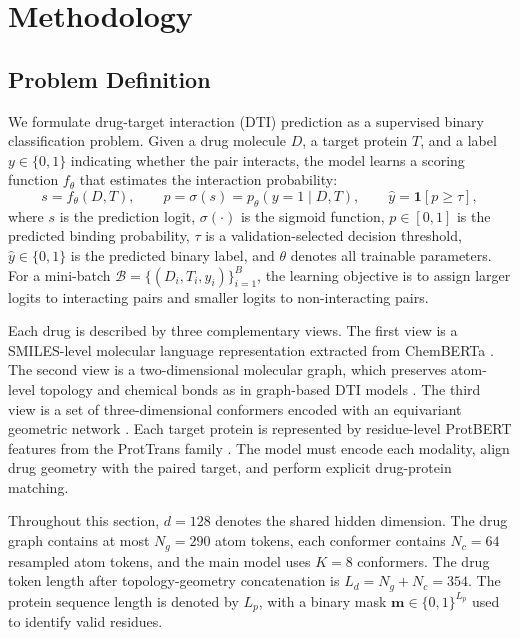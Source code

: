 \section{Methodology}
\label{sec:methodology}

\subsection{Problem Definition}
\label{sec:problem_definition}

We formulate drug-target interaction (DTI) prediction as a supervised binary
classification problem. Given a drug molecule $D$, a target protein $T$, and a
label $y\in\{0,1\}$ indicating whether the pair interacts, the model learns a
scoring function $f_{\theta}$ that estimates the interaction probability:
\begin{equation}
  s = f_{\theta}(D,T), \qquad
  p = \sigma(s)
  = p_{\theta}(y=1\mid D,T),
  \qquad
  \hat{y} = \mathbf{1}[p\!\ge\!\tau],
  \label{eq:dti_prediction}
\end{equation}
where $s$ is the prediction logit, $\sigma(\cdot)$ is the sigmoid function,
$p\in[0,1]$ is the predicted binding probability, $\tau$ is a
validation-selected decision threshold, $\hat{y}\in\{0,1\}$ is the predicted
binary label, and $\theta$ denotes all trainable parameters. For a mini-batch
$\mathcal{B}=\{(D_i,T_i,y_i)\}_{i=1}^{B}$, the learning objective is to assign
larger logits to interacting pairs and smaller logits to non-interacting pairs.

Each drug is described by three complementary views. The first view is a
SMILES-level molecular language representation extracted from ChemBERTa
\citep{chithrananda2020chemberta}. The second view is a two-dimensional
molecular graph, which preserves atom-level topology and chemical bonds as in
graph-based DTI models \citep{nguyen2021graphdta}. The third view is a set of
three-dimensional conformers encoded with an equivariant geometric network
\citep{satorras2021egnn}. Each target protein is represented by residue-level
ProtBERT features from the ProtTrans family \citep{elnaggar2021prottrans}. The
model must encode each modality, align drug geometry with the paired target,
and perform explicit drug-protein matching.

Throughout this section, $d=128$ denotes the shared hidden dimension. The drug
graph contains at most $N_g=290$ atom tokens, each conformer contains
$N_c=64$ resampled atom tokens, and the main model uses $K=8$ conformers. The
drug token length after topology-geometry concatenation is
$L_d=N_g+N_c=354$. The protein sequence length is denoted by $L_p$, with a
binary mask $\mathbf{m}\in\{0,1\}^{L_p}$ used to identify valid residues.

